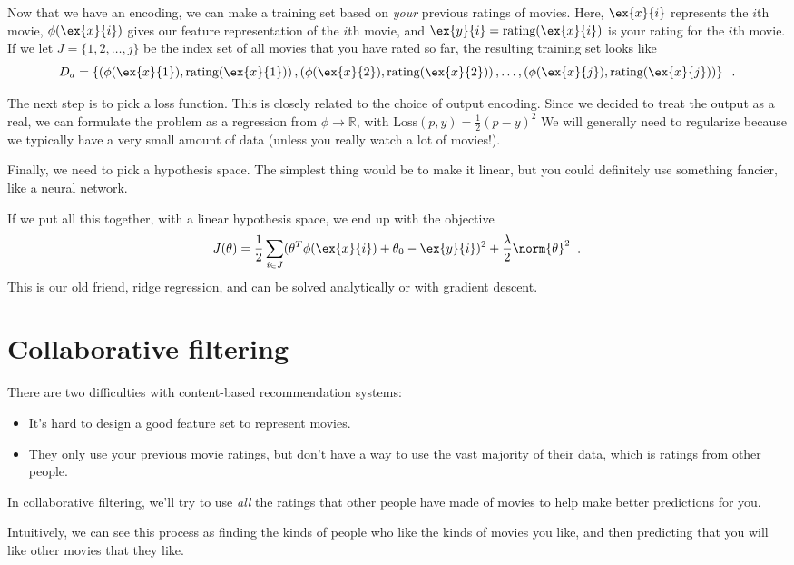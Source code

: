 Now that we have an encoding, we can make a
training set based on {\em your} previous ratings of movies. Here,
$\ex{x}{i}$ represents the $i$th movie, $\phi(\ex{x}{i})$ gives our
feature representation of the $i$th movie, and $\ex{y}{i} = \text{rating}(\ex{x}{i})$
is your rating for the $i$th movie. If we let $J = \{1,2, \ldots, j\}$ be the index set of all movies that you have rated so far,
the resulting training set looks like
\[ D_a = \left\{
  \left(\phi(\ex{x}{1}), \text{rating}(\ex{x}{1})\right),
  \left(\phi(\ex{x}{2}), \text{rating}(\ex{x}{2})\right),
  \ldots,
  \left(\phi(\ex{x}{j}), \text{rating}(\ex{x}{j})\right)
  \right\}\;\;.\]

The next step is to pick a loss function.  This is closely related to
the choice of output encoding.  Since we decided to treat the output
as a real, we can formulate the problem as a  regression from $\phi
  \rightarrow \mathbb{R}$, with $\text{Loss}(p, y) = \frac{1}{2}(p-y)^2$
We will generally need to regularize because we typically have a very
small amount of data (unless you really watch a lot of movies!).

Finally, we need to pick a hypothesis space.  The simplest thing would
be to make it linear, but you could definitely use something fancier,
like a neural network.

If we put all this together,  with  a linear hypothesis space, we end
up with the objective
\[J(\theta) = \frac{1}{2}\sum_{i \in J}
  (\theta^T \phi( \ex{x}{i} ) + \theta_0 - \ex{y}{i})^2
  + \frac{\lambda}{2} \norm{\theta}^2\;\;.\]
This is our old friend, ridge regression, and can be solved
analytically or with gradient descent.

\section{Collaborative filtering}
There are two difficulties with content-based recommendation systems:
\begin{itemize}
  \item It's hard to design a good feature set to represent movies.
  \item They only use your previous movie ratings, but don't have a way
        to use the vast majority of their data, which is ratings from other
        people.
\end{itemize}
In collaborative filtering, we'll try to use {\em all} the ratings
that other people have made of movies to help make
better predictions for you.

Intuitively, we can see this process as finding the kinds of people
who like the kinds of movies you like, and then predicting that you will
like other movies that they like.


